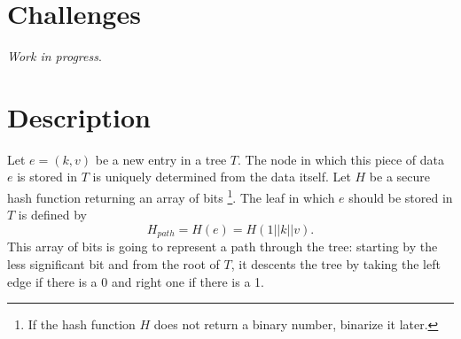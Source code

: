 \documentclass[11pt]{article}
\begin{document}


%

\section{Challenges}				%

{\it Work in progress}.

%
%


\section{Description}				%

Let $e=(k,v)$ be a new entry in a tree $T$. The node in which this piece of data $e$ is stored in $T$ is uniquely determined from the data itself. Let $H$ be a secure hash function returning an array of bits \footnote{If the hash function $H$ does not return a binary number, binarize it later.}. The leaf in which $e$ should be stored in $T$ is defined by 
$$H_{path} = H(e) = H(1 || k || v).$$ 
This array of bits is going to represent a path through the tree: starting by the less significant bit and from the root of $T$, it descents the tree by taking the left edge if there is a 0 and right one if there is a 1.\\ %
\end{document}
